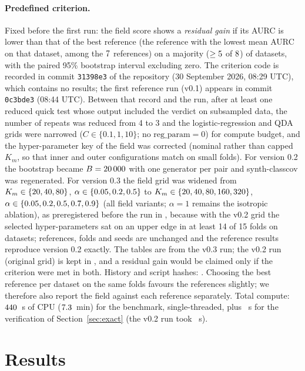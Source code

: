 \documentclass[10pt,a4paper]{article}
\theoremstyle{plain}
\theoremstyle{definition}
\theoremstyle{remark}
\begin{document}
\paragraph{Predefined criterion.} Fixed before the first run: the field score shows a \emph{residual gain} if its AURC is lower than that of the best reference (the reference with the lowest mean AURC on that dataset, among the $7$ references) on a majority ($\ge5$ of $8$) of datasets, with the paired 95\% bootstrap interval excluding zero. The criterion code is recorded in commit \texttt{31398e3} of the repository (30 September 2026, 08:29 UTC), which contains no results; the first reference run (v0.1) appears in commit \texttt{0c3bde3} (08:44 UTC). Between that record and the run, after at least one reduced quick test whose output included the verdict on subsampled data, the number of repeats was reduced from 4 to 3 and the logistic-regression and QDA grids were narrowed ($C\in\{0.1,1,10\}$; no $\mathrm{reg\_param}=0$) for compute budget, and the hyper-parameter key of the field was corrected (nominal rather than capped $K_m$, so that inner and outer configurations match on small folds). For version 0.2 the bootstrap became $B=20\,000$ with one generator per pair and synth-classcov was regenerated. For version 0.3 the field grid was widened from $K_m\in\{20, 40, 80\}$, $\alpha\in\{0.05, 0.2, 0.5\}$ to $K_m\in\{20, 40, 80, 160, 320\}$, $\alpha\in\{0.05, 0.2, 0.5, 0.7, 0.9\}$ (all field variants; $\alpha=1$ remains the isotropic ablation), as preregistered before the run in , because with the v0.2 grid the selected hyper-parameters sat on an upper edge in at least 14 of 15 folds on \VTwoSatFanisoDsHighN{} datasets; references, folds and seeds are unchanged and the reference results reproduce version 0.2 exactly. The tables are from the v0.3 run; the v0.2 run (original grid) is kept in , and a residual gain would be claimed only if the criterion were met in both. History and script hashes: . Choosing the best reference per dataset on the same folds favours the references slightly; we therefore also report the field against each reference separately. Total compute: $440$~s of CPU ($7.3$~min) for the benchmark, single-threaded, plus \IdCpuSeconds~s for the verification of Section~\ref{sec:exact} (the v0.2 run took \VTwoCpuSeconds~s).

\section{Results}\label{sec:results}
\end{document}
